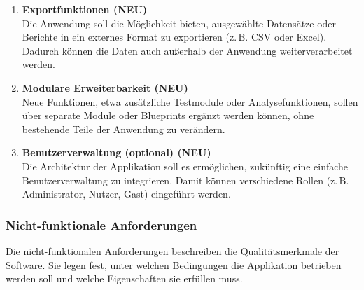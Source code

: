 \begin{enumerate}
  \item \textbf{Exportfunktionen \textbf{(NEU)}} \\
  Die Anwendung soll die Möglichkeit bieten, ausgewählte Datensätze oder Berichte in ein externes Format zu exportieren (z.\,B. CSV oder Excel).
  Dadurch können die Daten auch außerhalb der Anwendung weiterverarbeitet werden.

  \item \textbf{Modulare Erweiterbarkeit \textbf{(NEU)}} \\
  Neue Funktionen, etwa zusätzliche Testmodule oder Analysefunktionen, sollen über separate Module oder Blueprints ergänzt werden können, ohne bestehende Teile der Anwendung zu verändern.

  \item \textbf{Benutzerverwaltung (optional) \textbf{(NEU)}} \\
  Die Architektur der Applikation soll es ermöglichen, zukünftig eine einfache Benutzerverwaltung zu integrieren.
  Damit können verschiedene Rollen (z.\,B. Administrator, Nutzer, Gast) eingeführt werden.
\end{enumerate}

\subsubsection{Nicht-funktionale Anforderungen}
\label{subsec:nicht-funktionale-anforderungen}

Die nicht-funktionalen Anforderungen beschreiben die Qualitätsmerkmale der Software.
Sie legen fest, unter welchen Bedingungen die Applikation betrieben werden soll und welche Eigenschaften sie erfüllen muss.

